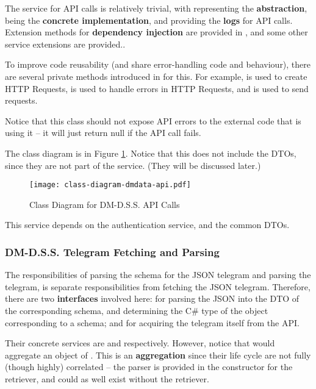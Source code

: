 The service for API calls is relatively trivial, with  representing the \textbf{abstraction},  being the \textbf{concrete implementation}, and  providing the \textbf{logs} for API calls. Extension methods for \textbf{dependency injection} are provided in , and some other service extensions are provided..

To improve code reusability (and share error-handling code and behaviour), there are several private methods introduced in  for this. For example,  is used to create HTTP Requests,  is used to handle errors in HTTP Requests, and  is used to send requests.

Notice that this class should not expose API errors to the external code that is using it -- it will just return null if the API call fails.

The class diagram is in Figure \ref{fig:class-diagram-dmdata-api}. Notice that this does not include the DTOs, since they are not part of the service. (They will be discussed later.)

\begin{figure}[htp]
    \centering
    \texttt{[image: class-diagram-dmdata-api.pdf]}
    \caption{Class Diagram for DM-D.S.S. API Calls}
    \label{fig:class-diagram-dmdata-api}
\end{figure}

This service depends on the authentication service, and the common DTOs.

\subsubsection{DM-D.S.S. Telegram Fetching and Parsing}

The responsibilities of parsing the schema for the JSON telegram and parsing the telegram, is separate responsibilities from fetching the JSON telegram. Therefore, there are two \textbf{interfaces} involved here:  for parsing the JSON into the DTO of the corresponding schema, and determining the C\# type of the object corresponding to a schema; and  for acquiring the telegram itself from the API.

Their concrete services are  and  respectively. However, notice that  would aggregate an object of . This is an \textbf{aggregation} since their life cycle are not fully (though highly) correlated -- the parser is provided in the constructor for the retriever, and could as well exist without the retriever.

